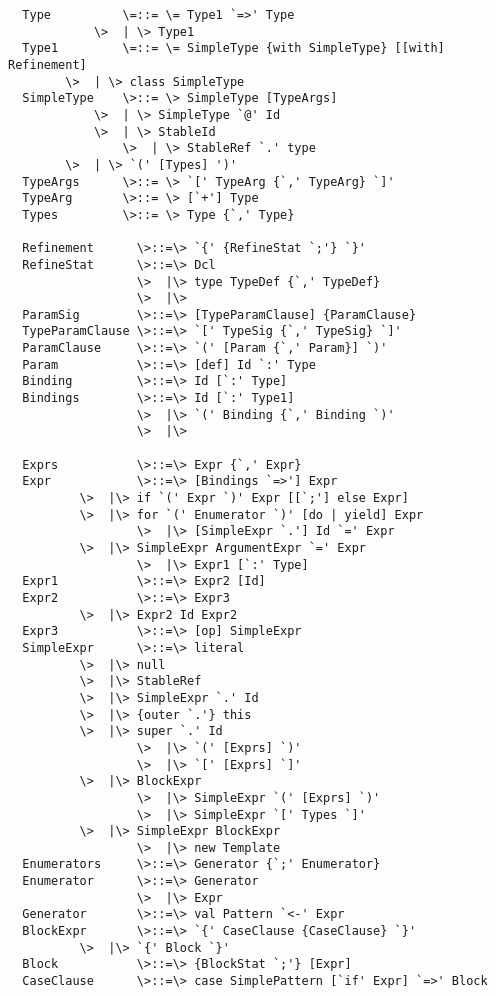 \documentclass[11pt]{report}
\begin{document}
\begin{verbatim}
  Type          \=::= \= Type1 `=>' Type
	        \>  | \> Type1
  Type1         \=::= \= SimpleType {with SimpleType} [[with] Refinement]
		\>  | \> class SimpleType
  SimpleType   	\>::= \> SimpleType [TypeArgs]
	        \>  | \> SimpleType `@' Id
	        \>  | \> StableId
                \>  | \> StableRef `.' type
		\>  | \> `(' [Types] ')'
  TypeArgs     	\>::= \> `[' TypeArg {`,' TypeArg} `]'
  TypeArg      	\>::= \> [`+'] Type
  Types         \>::= \> Type {`,' Type}

  Refinement      \>::=\> `{' {RefineStat `;'} `}'
  RefineStat      \>::=\> Dcl
                  \>  |\> type TypeDef {`,' TypeDef}
                  \>  |\>
  ParamSig        \>::=\> [TypeParamClause] {ParamClause}
  TypeParamClause \>::=\> `[' TypeSig {`,' TypeSig} `]'
  ParamClause     \>::=\> `(' [Param {`,' Param}] `)'
  Param           \>::=\> [def] Id `:' Type
  Binding         \>::=\> Id [`:' Type]
  Bindings        \>::=\> Id [`:' Type1]
                  \>  |\> `(' Binding {`,' Binding `)'
                  \>  |\>

  Exprs           \>::=\> Expr {`,' Expr}
  Expr            \>::=\> [Bindings `=>'] Expr
		  \>  |\> if `(' Expr `)' Expr [[`;'] else Expr]
		  \>  |\> for `(' Enumerator `)' [do | yield] Expr
                  \>  |\> [SimpleExpr `.'] Id `=' Expr
		  \>  |\> SimpleExpr ArgumentExpr `=' Expr
                  \>  |\> Expr1 [`:' Type]
  Expr1           \>::=\> Expr2 [Id]
  Expr2           \>::=\> Expr3
		  \>  |\> Expr2 Id Expr2
  Expr3           \>::=\> [op] SimpleExpr
  SimpleExpr      \>::=\> literal
		  \>  |\> null
		  \>  |\> StableRef
		  \>  |\> SimpleExpr `.' Id
		  \>  |\> {outer `.'} this
		  \>  |\> super `.' Id
                  \>  |\> `(' [Exprs] `)'
                  \>  |\> `[' [Exprs] `]'
		  \>  |\> BlockExpr
                  \>  |\> SimpleExpr `(' [Exprs] `)'
                  \>  |\> SimpleExpr `[' Types `]'
		  \>  |\> SimpleExpr BlockExpr
                  \>  |\> new Template
  Enumerators     \>::=\> Generator {`;' Enumerator}
  Enumerator      \>::=\> Generator
                  \>  |\> Expr
  Generator       \>::=\> val Pattern `<-' Expr
  BlockExpr       \>::=\> `{' CaseClause {CaseClause} `}'
		  \>  |\> `{' Block `}'
  Block           \>::=\> {BlockStat `;'} [Expr]
  CaseClause      \>::=\> case SimplePattern [`if' Expr] `=>' Block
\end{verbatim}
\end{document}
